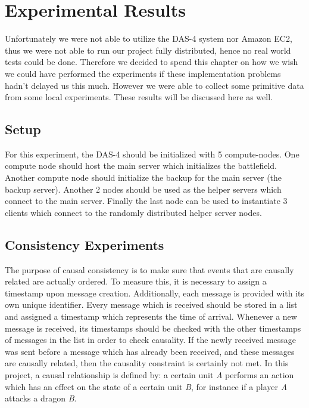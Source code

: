 \section{Experimental Results}
Unfortunately we were not able to utilize the DAS-4 system nor Amazon EC2, thus we were not able to run our project fully distributed, hence no real world tests could be done. Therefore we decided to spend this chapter on how we wish we could have performed the experiments if these implementation problems hadn't delayed us this much. However we were able to collect some primitive data from some local experiments. These results will be discussed here as well.

\subsection{Setup}
For this experiment, the DAS-4 should be initialized with 5 compute-nodes. 
One compute node should host the main server which initializes the battlefield. 
Another compute node should initialize the backup for the main server (the backup server). 
Another 2 nodes should be used as the helper servers which connect to the main server. 
Finally the last node can be used to instantiate 3 clients which connect to the randomly distributed helper server nodes.

\subsection{Consistency Experiments}
The purpose of causal consistency is to make sure that events that are causally related are actually ordered. 
To measure this, it is necessary to assign a timestamp upon message creation. 
Additionally, each message is provided with its own unique identifier. 
Every message which is received should be stored in a list and assigned a timestamp which represents the time of arrival.
Whenever a new message is received, its timestamps should be checked with the other timestamps of messages in the list in order to check causality. If the newly received message was sent before a message which has already been received, and these messages are causally related, then the causality constraint is certainly not met.
In this project, a causal relationship is defined by: a certain unit \emph{A} performs an action which has an effect on the state of a certain unit \emph{B}, for instance if a player \emph{A} attacks a dragon \emph{B}.


